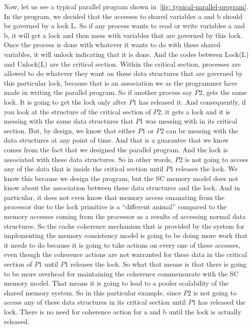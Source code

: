 \documentclass[11pt]{lecture}
\begin{document}
Now, let us see a typical parallel program shown in~\autoref{fig: typical-parallel-program}. 
In the program, we decided that 
the accesses to shared variables {\code a} and {\code b} should be governed by a lock 
{\code L}. So if any process wants to read or write variables {\code a} and {\code b}, it will get a lock 
and then mess with variables that are governed by this lock. Once the process is done with whatever 
it wants to do with 
these shared variables, it will unlock indicating that it is done. And the codes between 
{\code Lock(L)} and {\code Unlock(L)} are the critical section. Within the critical section, 
processes are allowed to do whatever they want on these data structures that are governed by this particular lock, 
because that is an association we as the programmer have made in writing the parallel program. So if another process 
say $P2$, gets the same lock. It is going to get the lock only after $P1$ has released it. And consequently, 
if you look at the structure of the critical section of $P2$, it gets a lock and it is messing 
with the same data structures that $P1$ was messing with in its critical section. But, by design, we know 
that either $P1$ or $P2$ can be messing with the data structures at any point of time. And that is a 
guarantee that we know comes from the fact that we designed the parallel program. And the lock is associated with these data 
structures. So in other words, $P2$ is not going to access any of the data that is inside the critical section until $P1$ 
releases the lock. We know this because we design the program, but the SC memory model does not know 
about the association between these data structures and the lock. And in particular, it does not 
even know that memory access emanating from the processor due to the lock primitive is a ``different animal'' 
compared to the memory accesses coming from the processor as a results of accessing normal data 
structures. So the cache coherence mechanism that is provided by the system for implementing the 
memory consistency model is going to be doing more work that it needs to do because it is going to take actions on every 
one of these accesses, even though the coherence actions are not warranted for these data in the critical section 
of $P1$ until $P1$ releases the lock. So what that means is that there is going to be more overhead for 
maintaining the coherence commensurate with the SC memory model. That means it is going to lead to a pooler 
scalability of the shared memory system. So in this particular example, since $P2$ is not going to access any 
of these data structures in its critical section until $P1$ has released the lock. There is no need for 
coherence action for {\code a} and {\code b} until the lock is actually released. 
\end{document}

